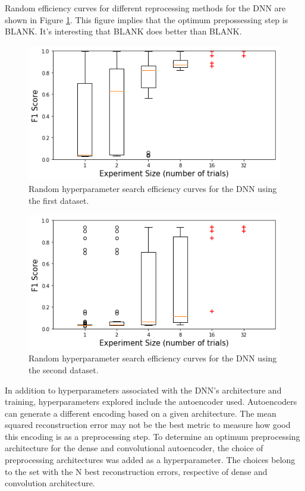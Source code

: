 Random efficiency curves for different reprocessing methods for the DNN are shown in Figure \ref{fig:random_hp_search_dnn_easy}. This figure implies that the optimum prepossessing step is BLANK. It's interesting that BLANK does better than BLANK.

\begin{figure}[H]
	\centering
	\includegraphics[width=0.8\linewidth]{images/random_hp_search_dnn_easy}
	\caption{Random hyperparameter search efficiency curves for the DNN using the first dataset.}
	\label{fig:random_hp_search_dnn_easy}
\end{figure}

\begin{figure}[H]
	\centering
	\includegraphics[width=0.8\linewidth]{images/random_hp_search_dnn_full}
	\caption{Random hyperparameter search efficiency curves for the DNN using the second dataset.}
	\label{fig:random_hp_search_dnn_full}
\end{figure}

In addition to hyperparameters associated with the DNN's architecture and training, hyperparameters explored include the autoencoder used. Autoencoders can generate a different encoding based on a given architecture. The mean squared reconstruction error may not be the best metric to measure how good this encoding is as a preprocessing step. To determine an optimum preprocessing architecture for the dense and convolutional autoencoder, the choice of preprocessing architectures was added as a hyperparameter. The choices belong to the set with the N best reconstruction errors, respective of dense and convolution architecture.

